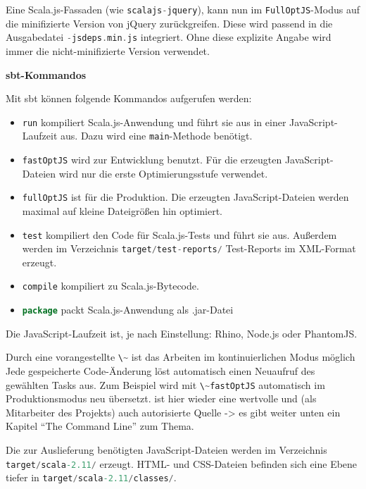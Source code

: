 \documentclass[a4paper, 12pt, hidelinks, listof=totoc, listoftables=totoc, bibliography=totoc]{scrreprt}
\newcommand{\code}[1]{\lstinline[language=Scala, style=inline]|#1|}
\newcommand{\MyMiniSec}[1]{\rmfamily\fontsize{12}{15}\selectfont
	\vspace{7pt}\textbf{#1} %
}
\begin{document}
Eine Scala.js-Fassaden (wie \code{scalajs-jquery}), kann nun im \code{FullOptJS}-Modus auf die minifizierte Version von jQuery zurückgreifen. Diese wird passend in die Ausgabedatei \mbox{\code{-jsdeps.min.js}} integriert. Ohne diese explizite Angabe wird immer die nicht-minifizierte Version verwendet.


\MyMiniSec{sbt-Kommandos}

Mit sbt können folgende Kommandos aufgerufen werden:

\begin{itemize}
\item \code{run} kompiliert Scala.js-Anwendung und führt sie aus in einer JavaScript-Laufzeit aus. Dazu wird eine \code{main}-Methode benötigt.
\item \code{fastOptJS} wird zur Entwicklung benutzt. Für die erzeugten JavaScript-Dateien wird nur die erste Optimierungsstufe verwendet.
\item \code{fullOptJS} ist für die Produktion. Die erzeugten JavaScript-Dateien werden maximal auf kleine Dateigrößen hin optimiert.
\item \code{test} kompiliert den Code für Scala.js-Tests und führt sie aus. Außerdem werden im Verzeichnis \code{target/test-reports/} Test-Reports im \ac{XML}-Format erzeugt.
\item \code{compile} kompiliert zu Scala.js-Bytecode.
\item \code{package} packt Scala.js-Anwendung als .jar-Datei
\end{itemize}

Die JavaScript-Laufzeit ist, je nach Einstellung: Rhino, Node.js oder PhantomJS.

Durch eine vorangestellte \code{\~} ist das Arbeiten im kontinuierlichen Modus möglich
Jede gespeicherte Code-Änderung löst automatisch einen Neuaufruf des gewählten Tasks aus. Zum Beispiel wird mit \code{\~fastOptJS} automatisch im Produktionsmodus neu übersetzt. \cite[\#TheCommandLine]{haoyi.HOS} ist hier wieder eine wertvolle und (als Mitarbeiter des Projekts) auch autorisierte Quelle -> es gibt weiter unten ein Kapitel "`The Command Line"' zum Thema.

Die zur Auslieferung benötigten JavaScript-Dateien werden im Verzeichnis 
\linebreak\mbox{\code{target/scala-2.11/}} erzeugt. \ac{HTML}- und \ac{CSS}-Dateien befinden sich eine Ebene tiefer in \linebreak\mbox{\code{target/scala-2.11/classes/}}.
\end{document}
